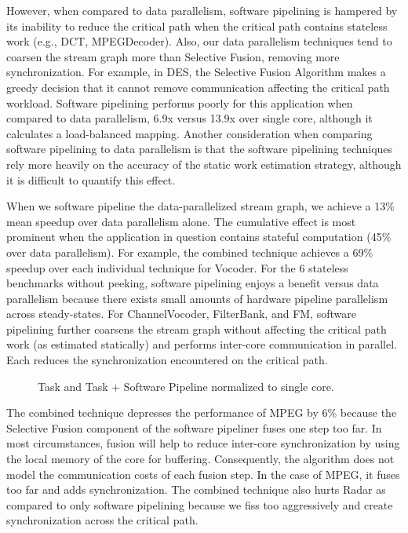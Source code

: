 However, when compared to data parallelism, software pipelining is
hampered by its inability to reduce the critical path when the
critical path contains stateless work (e.g., DCT, MPEGDecoder).  Also,
our data parallelism techniques tend to coarsen the stream graph more
than Selective Fusion, removing more synchronization.  For example, in
DES, the Selective Fusion Algorithm makes a greedy decision that it
cannot remove communication affecting the critical path workload.
Software pipelining performs poorly for this application when compared
to data parallelism, 6.9x versus 13.9x over single core, although it
calculates a load-balanced mapping.  Another consideration when
comparing software pipelining to data parallelism is that the software
pipelining techniques rely more heavily on the accuracy of the static
work estimation strategy, although it is difficult to quantify this
effect.

When we software pipeline the data-parallelized stream graph, we
achieve a 13\% mean speedup over data parallelism alone. The
cumulative effect is most prominent when the application in question
contains stateful computation (45\% over data parallelism).  For
example, the combined technique achieves a 69\% speedup over each
individual technique for Vocoder. For the 6 stateless benchmarks
without peeking, software pipelining enjoys a benefit versus data
parallelism because there exists small amounts of hardware pipeline
parallelism across steady-states.  For ChannelVocoder, FilterBank, and
FM, software pipelining further coarsens the stream graph without
affecting the critical path work (as estimated statically) and
performs inter-core communication in parallel.  Each reduces the
synchronization encountered on the critical path.

\begin{figure}[t]
\centering
{}
\caption{Task and Task + Software Pipeline normalized to single core.
\protect\label{fig:softpipe_graph}}
\vspace{-6pt}
\end{figure}
The combined technique depresses the performance of MPEG by 6\%
because the Selective Fusion component of the software pipeliner fuses
one step too far.  In most circumstances, fusion will help to reduce
inter-core synchronization by using the local memory of the core for
buffering. Consequently, the algorithm does not model the
communication costs of each fusion step. In the case of MPEG, it fuses
too far and adds synchronization. The combined technique also hurts
Radar as compared to only software pipelining because we fiss too
aggressively and create synchronization across the critical path.

